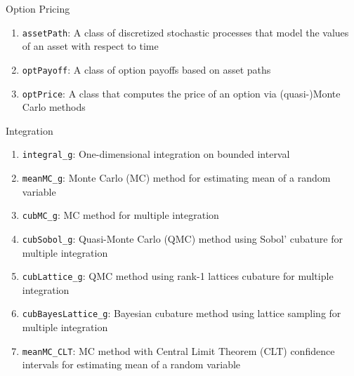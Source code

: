 \documentclass[final]{beamer}
\newlength{\onecolwid}
\begin{document}
\begin{frame}[t]
\begin{columns}[t]
\begin{column}{\onecolwid}
\begin{block}{Option Pricing}

\begin{enumerate}\setlength\itemsep{1em}
\item \texttt{assetPath}: A class of discretized stochastic processes that model the values of an asset with respect to time \cite{ChoEtal18b}
\item \texttt{optPayoff}: A class of option payoffs based on asset paths \cite{ChoEtal18b}
\item \texttt{optPrice}: A class that computes the price of an option via (quasi-)Monte Carlo methods \cite{ChoEtal18b}
\end{enumerate}

\end{block}

\begin{block}{Integration}

\begin{enumerate} \setlength\itemsep{1em}

\item \texttt{integral\_g}: One-dimensional integration on bounded interval \cite{ChoEtal18b}
\item \texttt{meanMC\_g}: Monte Carlo (MC) method for estimating mean of a random variable \cite{meanMCcubMC}
\item \texttt{cubMC\_g}: MC method for  multiple integration \cite{meanMCcubMC}
\item \texttt{cubSobol\_g}: Quasi-Monte Carlo (QMC) method using Sobol' cubature for multiple integration \cite{cubSobol}
\item \texttt{cubLattice\_g}: QMC method using rank-1 lattices cubature for multiple integration \cite{cubLattice}
\item \texttt{cubBayesLattice\_g}: Bayesian cubature method using lattice sampling for multiple integration \cite{cubBayesLattice}
\item \texttt{meanMC\_CLT}: MC method with Central Limit Theorem (CLT) confidence intervals for estimating mean of a random variable \cite{ChoEtal18b}
\end{enumerate}

\end{block}




\end{column} %


\end{columns}
\end{frame}
\end{document}
